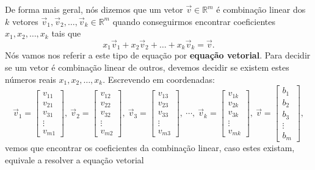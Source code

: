De forma mais geral, nós dizemos que um vetor $\vec{v} \in \mathbb{R}^m$ é combinação linear dos $k$ vetores $\vec{v}_1, \vec{v}_2, \dots, \vec{v}_k  \in \mathbb{R}^m$ quando conseguirmos encontrar coeficientes $x_1, x_2, \dots, x_k$ tais que
\begin{equation}
x_1 \vec{v}_1 + x_2 \vec{v}_2 + \dots + x_k \vec{v}_k = \vec{v}.
\end{equation} Nós vamos nos referir a este tipo de equação por \textbf{equação vetorial}. Para decidir se um vetor é combinação linear de outros, devemos decidir se existem estes números reais $x_1, x_2, \dots, x_k$. Escrevendo em coordenadas:
\begin{equation}
\vec{v}_1 =
\left[
\begin{array}{c}
v_{11} \\
v_{21} \\
v_{31} \\
\vdots \\
v_{m1}
\end{array}
\right], \
\vec{v}_2 =
\left[
\begin{array}{c}
v_{12} \\
v_{22} \\
v_{32} \\
\vdots \\
v_{m2}
\end{array}
\right], \
\vec{v}_3 =
\left[
\begin{array}{c}
v_{13} \\
v_{23} \\
v_{33} \\
\vdots \\
v_{m3}
\end{array}
\right], \ \cdots, \
\vec{v}_k =
\left[
\begin{array}{c}
v_{1k} \\
v_{2k} \\
v_{3k} \\
\vdots \\
v_{mk}
\end{array}
\right], \
\vec{v} =
\left[
\begin{array}{c}
b_{1} \\
b_{2} \\
b_{3} \\
\vdots \\
b_{m}
\end{array}
\right],
\end{equation} vemos que encontrar os coeficientes da combinação linear, caso estes existam, equivale a resolver a equação vetorial
